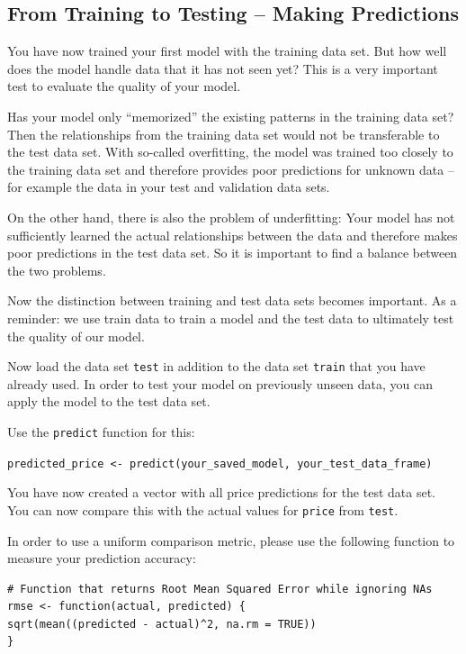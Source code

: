 \documentclass[
  11pt,
]{article}
\newenvironment{tips}[1]
  {
  \begin{itemize}
  \footnotesize
  \renewcommand{\labelitemi}{
    \raisebox{-.7\height}[0pt][0pt]{
      {\setkeys{Gin}{width=3em,keepaspectratio}
        \texttt{[image: images/\#1.png]}}
    }
  }
  \setlength{\fboxsep}{1em}
  \begin{rbox}
  \item
  }
  {
  \end{rbox}
  \end{itemize}
  }
\begin{document}
\hypertarget{from-training-to-testing-making-predictions}{%
\subsection{From Training to Testing -- Making Predictions}\label{from-training-to-testing-making-predictions}}

You have now trained your first model with the training data set. But how well does the model handle data that it has not seen yet? This is a very important test to evaluate the quality of your model.

Has your model only ``memorized'' the existing patterns in the training data set?
Then the relationships from the training data set would not be transferable to the test data set. With so-called overfitting, the model was trained too closely to the training data set and therefore provides poor predictions for unknown data -- for example the data in your test and validation data sets.

On the other hand, there is also the problem of underfitting: Your model has not sufficiently learned the actual relationships between the data and therefore makes poor predictions in the test data set. So it is important to find a balance between the two problems.

Now the distinction between training and test data sets becomes important. As a reminder: we use train data to train a model and the test data to ultimately test the quality of our model.

Now load the data set \texttt{test} in addition to the data set \texttt{train} that you have already used. In order to test your model on previously unseen data, you can apply the model to the test data set.

\begin{tips}r

Use the \texttt{predict} function for this:

\texttt{predicted\_price\ \textless{}-\ predict(your\_saved\_model,\ your\_test\_data\_frame)}

You have now created a vector with all price predictions for the test data set. You can now compare this with the actual values for \texttt{price} from \texttt{test}.

In order to use a uniform comparison metric, please use the following function to measure your prediction accuracy:

\begin{verbatim}
# Function that returns Root Mean Squared Error while ignoring NAs
rmse <- function(actual, predicted) {
sqrt(mean((predicted - actual)^2, na.rm = TRUE))
}
\end{verbatim}

\end{tips}
\end{document}
